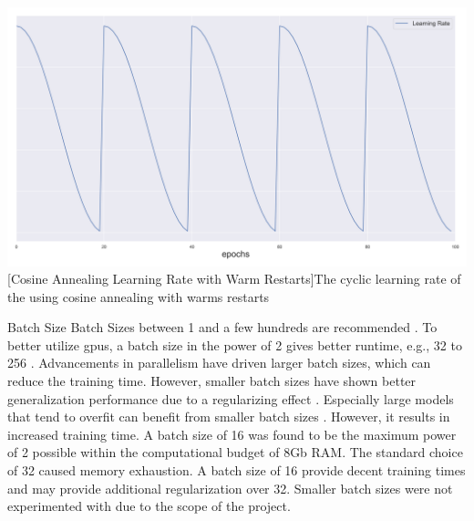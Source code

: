 \begin{enumdescript}
\begin{enumdescript}
		\begin{minipage}[t]{\linewidth}
			\centering
			\includegraphics[width=.7\linewidth]{figures/lr.png}
			[Cosine Annealing Learning Rate with Warm Restarts]{The cyclic learning rate of the using cosine annealing with warms restarts} 
			\label{fig:cosineannealing}
		\end{minipage}
		
		\item[Batch Size] Batch Sizes between 1 and a few hundreds are recommended \cite{bengio_practical_2012}. To better utilize \gls{gpu}s, a batch size in the power of 2 gives better runtime, e.g., 32 to 256 \cite{goodfellow_deep_2016}. Advancements in parallelism \cite{dean_large_2012} have driven larger batch sizes, which can reduce the training time. However, smaller batch sizes have shown better generalization performance due to a regularizing effect \cite{masters_revisiting_nodate}. Especially large models that tend to overfit can benefit from smaller batch sizes \cite{goodfellow_deep_2016}. However, it results in increased training time.
		A batch size of 16 was found to be the maximum power of 2 possible within the computational budget of 8Gb RAM. The standard choice of 32 caused memory exhaustion. A batch size of 16 provide decent training times and may provide additional regularization over 32. Smaller batch sizes were not experimented with due to the scope of the project.
		

\end{enumdescript}
\end{enumdescript}
